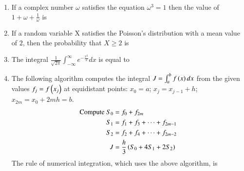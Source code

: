 \documentclass[journal,12pt,onecolumn]{IEEEtran}
\theoremstyle{remark}
\begin{document}
\begin{enumerate}
\item If a complex number $\omega$ satisfies the equation $\omega^3 = 1$ then the value of $1 + \omega + \frac{1}{\omega}$ is
\hfill{}
\begin{enumerate}
\end{enumerate}

\item If a random variable X satisfies the Poisson's distribution with a mean value of $2$, then the probability that $X \ge 2$ is
\hfill{}
\begin{enumerate}
\end{enumerate}

\item The integral $\frac{1}{\sqrt{2\pi}} \int_{-\infty}^{\infty} e^{-\frac{x^2}{2}} dx$ is equal to
\hfill{}
\begin{enumerate}
\end{enumerate}

\item The following algorithm computes the integral $J = \int_a^b f\left(x\right)dx$ from the given values $f_j = f\left(x_j\right)$ at equidistant points: $x_0 = a$; $x_j = x_{j-1} + h$; $x_{2m} = x_0 + 2mh = b$.
\begin{align*}
\text{Compute } S_0 &= f_0 + f_{2m} \\
S_1 &= f_1 + f_3 + \dots + f_{2m-1} \\
S_2 &= f_2 + f_4 + \dots + f_{2m-2} \\
J &= \frac{h}{3}\left(S_0 + 4S_1 + 2S_2\right)
\end{align*}
The rule of numerical integration, which uses the above algorithm, is
\hfill{}
\begin{enumerate}
\end{enumerate}


\end{enumerate}
\end{document}

